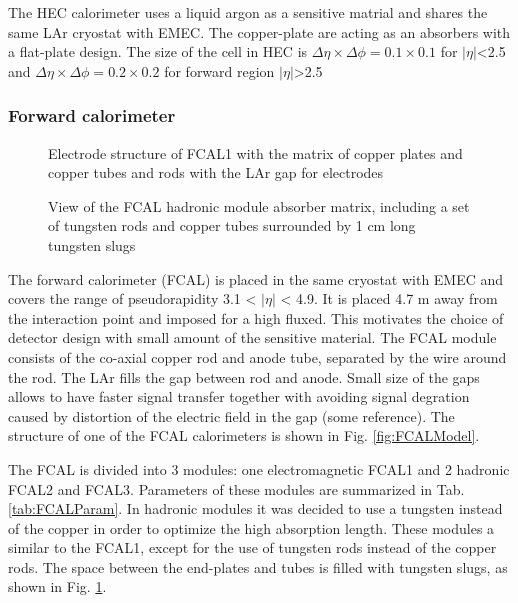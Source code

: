 The HEC calorimeter uses a liquid argon as a sensitive matrial and shares the same LAr cryostat with EMEC. The copper-plate are acting as an absorbers with a flat-plate design. The size of the cell in HEC is $\Delta \eta \times \Delta \phi = 0.1 \times 0.1$ for $|\eta|$<2.5 and $\Delta \eta \times \Delta \phi = 0.2 \times 0.2$ for forward region $|\eta|$>2.5


\subsubsection{Forward calorimeter}


\begin{figure}[!tbp]
\begin{minipage}[h]{0.45\linewidth}
\caption{Electrode structure of FCAL1 with the matrix of copper plates and copper tubes and rods with the LAr gap for electrodes \cite{AtlasExperiment}}
\label{fig:FCALModel}
\end{minipage}
\hfill
\begin{minipage}[h]{0.49\linewidth}
\caption{View of the FCAL hadronic module absorber matrix, including a set of tungsten rods and copper tubes surrounded by 1 cm long tungsten slugs\cite{AtlasExperiment}}
\label{fig:FCAL2}
\end{minipage}
\end{figure}


The forward calorimeter (FCAL) is placed in the same cryostat with EMEC and covers the range of pseudorapidity 3.1 < $|\eta|$ < 4.9. It is placed 4.7 m away from the interaction point and imposed for a high fluxed. This motivates the choice of detector design with small amount of the sensitive material.  The FCAL module consists of the co-axial copper rod and anode tube, separated by the wire around the rod. The LAr fills the gap between rod and anode. Small size of the gaps allows to have faster signal transfer together with avoiding signal degration caused by distortion of the electric field in the gap (some reference). The structure of one of the FCAL calorimeters is shown in Fig. \ref{fig:FCALModel}.

The FCAL is divided into 3 modules: one electromagnetic FCAL1 and 2 hadronic FCAL2 and FCAL3. Parameters of these modules are summarized in Tab. \ref{tab:FCALParam}. In hadronic modules it was decided to use a tungsten instead of the copper in order to optimize the high absorption length. These modules a similar to the FCAL1, except for the use of tungsten rods instead of the copper rods. The space between the end-plates and tubes is filled with tungsten slugs, as shown in Fig. \ref{fig:FCAL2}.

